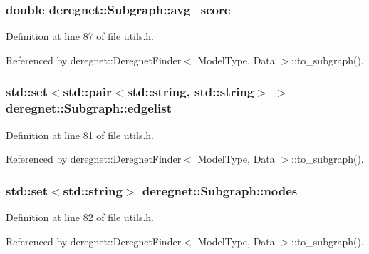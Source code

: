 \subsubsection[{\texorpdfstring{avg\+\_\+score}{avg_score}}]{\setlength{\rightskip}{0pt plus 5cm}double deregnet\+::\+Subgraph\+::avg\+\_\+score}\hypertarget{structderegnet_1_1Subgraph_ad2836fb4bf0db09a91363f5fc894a02a}{}\label{structderegnet_1_1Subgraph_ad2836fb4bf0db09a91363f5fc894a02a}


Definition at line 87 of file utils.\+h.



Referenced by deregnet\+::\+Deregnet\+Finder$<$ Model\+Type, Data $>$\+::to\+\_\+subgraph().

\subsubsection[{\texorpdfstring{edgelist}{edgelist}}]{\setlength{\rightskip}{0pt plus 5cm}std\+::set$<$std\+::pair$<$std\+::string, std\+::string$>$ $>$ deregnet\+::\+Subgraph\+::edgelist}\hypertarget{structderegnet_1_1Subgraph_a918a816236f30355b2ec812af629db09}{}\label{structderegnet_1_1Subgraph_a918a816236f30355b2ec812af629db09}


Definition at line 81 of file utils.\+h.



Referenced by deregnet\+::\+Deregnet\+Finder$<$ Model\+Type, Data $>$\+::to\+\_\+subgraph().

\subsubsection[{\texorpdfstring{nodes}{nodes}}]{\setlength{\rightskip}{0pt plus 5cm}std\+::set$<$std\+::string$>$ deregnet\+::\+Subgraph\+::nodes}\hypertarget{structderegnet_1_1Subgraph_a6f8b8d288c1314cc9623e732c5b89056}{}\label{structderegnet_1_1Subgraph_a6f8b8d288c1314cc9623e732c5b89056}


Definition at line 82 of file utils.\+h.



Referenced by deregnet\+::\+Deregnet\+Finder$<$ Model\+Type, Data $>$\+::to\+\_\+subgraph().

